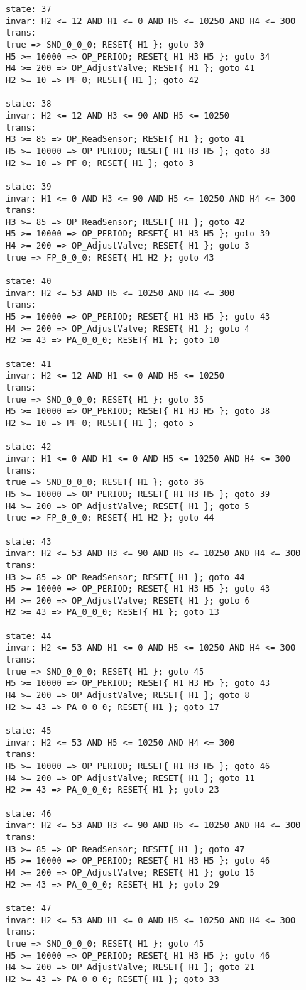 {\begin{verbatim}
state: 37
invar: H2 <= 12 AND H1 <= 0 AND H5 <= 10250 AND H4 <= 300
trans: 
true => SND_0_0_0; RESET{ H1 }; goto 30
H5 >= 10000 => OP_PERIOD; RESET{ H1 H3 H5 }; goto 34
H4 >= 200 => OP_AdjustValve; RESET{ H1 }; goto 41
H2 >= 10 => PF_0; RESET{ H1 }; goto 42

state: 38
invar: H2 <= 12 AND H3 <= 90 AND H5 <= 10250
trans: 
H3 >= 85 => OP_ReadSensor; RESET{ H1 }; goto 41
H5 >= 10000 => OP_PERIOD; RESET{ H1 H3 H5 }; goto 38
H2 >= 10 => PF_0; RESET{ H1 }; goto 3

state: 39
invar: H1 <= 0 AND H3 <= 90 AND H5 <= 10250 AND H4 <= 300
trans: 
H3 >= 85 => OP_ReadSensor; RESET{ H1 }; goto 42
H5 >= 10000 => OP_PERIOD; RESET{ H1 H3 H5 }; goto 39
H4 >= 200 => OP_AdjustValve; RESET{ H1 }; goto 3
true => FP_0_0_0; RESET{ H1 H2 }; goto 43

state: 40
invar: H2 <= 53 AND H5 <= 10250 AND H4 <= 300
trans: 
H5 >= 10000 => OP_PERIOD; RESET{ H1 H3 H5 }; goto 43
H4 >= 200 => OP_AdjustValve; RESET{ H1 }; goto 4
H2 >= 43 => PA_0_0_0; RESET{ H1 }; goto 10

state: 41
invar: H2 <= 12 AND H1 <= 0 AND H5 <= 10250
trans: 
true => SND_0_0_0; RESET{ H1 }; goto 35
H5 >= 10000 => OP_PERIOD; RESET{ H1 H3 H5 }; goto 38
H2 >= 10 => PF_0; RESET{ H1 }; goto 5

state: 42
invar: H1 <= 0 AND H1 <= 0 AND H5 <= 10250 AND H4 <= 300
trans: 
true => SND_0_0_0; RESET{ H1 }; goto 36
H5 >= 10000 => OP_PERIOD; RESET{ H1 H3 H5 }; goto 39
H4 >= 200 => OP_AdjustValve; RESET{ H1 }; goto 5
true => FP_0_0_0; RESET{ H1 H2 }; goto 44

state: 43
invar: H2 <= 53 AND H3 <= 90 AND H5 <= 10250 AND H4 <= 300
trans: 
H3 >= 85 => OP_ReadSensor; RESET{ H1 }; goto 44
H5 >= 10000 => OP_PERIOD; RESET{ H1 H3 H5 }; goto 43
H4 >= 200 => OP_AdjustValve; RESET{ H1 }; goto 6
H2 >= 43 => PA_0_0_0; RESET{ H1 }; goto 13

state: 44
invar: H2 <= 53 AND H1 <= 0 AND H5 <= 10250 AND H4 <= 300
trans: 
true => SND_0_0_0; RESET{ H1 }; goto 45
H5 >= 10000 => OP_PERIOD; RESET{ H1 H3 H5 }; goto 43
H4 >= 200 => OP_AdjustValve; RESET{ H1 }; goto 8
H2 >= 43 => PA_0_0_0; RESET{ H1 }; goto 17

state: 45
invar: H2 <= 53 AND H5 <= 10250 AND H4 <= 300
trans: 
H5 >= 10000 => OP_PERIOD; RESET{ H1 H3 H5 }; goto 46
H4 >= 200 => OP_AdjustValve; RESET{ H1 }; goto 11
H2 >= 43 => PA_0_0_0; RESET{ H1 }; goto 23

state: 46
invar: H2 <= 53 AND H3 <= 90 AND H5 <= 10250 AND H4 <= 300
trans: 
H3 >= 85 => OP_ReadSensor; RESET{ H1 }; goto 47
H5 >= 10000 => OP_PERIOD; RESET{ H1 H3 H5 }; goto 46
H4 >= 200 => OP_AdjustValve; RESET{ H1 }; goto 15
H2 >= 43 => PA_0_0_0; RESET{ H1 }; goto 29

state: 47
invar: H2 <= 53 AND H1 <= 0 AND H5 <= 10250 AND H4 <= 300
trans: 
true => SND_0_0_0; RESET{ H1 }; goto 45
H5 >= 10000 => OP_PERIOD; RESET{ H1 H3 H5 }; goto 46
H4 >= 200 => OP_AdjustValve; RESET{ H1 }; goto 21
H2 >= 43 => PA_0_0_0; RESET{ H1 }; goto 33
\end{verbatim}
}
\onecolumn

